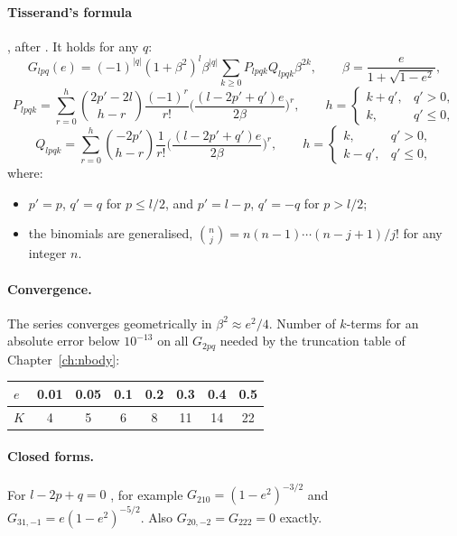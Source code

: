 \paragraph{Tisserand's formula} \citep[eq.~3.67--3.69]{Kaula2000}, after \citet[p.~256]{Tisserand1889}. It holds for any $q$:
\begin{equation}
  G_{lpq}(e)=(-1)^{|q|}(1+\beta^2)^l\beta^{|q|}\sum_{k\ge0}P_{lpqk}Q_{lpqk}\beta^{2k},\qquad \beta=\frac{e}{1+\sqrt{1-e^2}}, \label{eq:tisserand}
\end{equation}
\[
  P_{lpqk}=\sum_{r=0}^{h}\binom{2p'-2l}{h-r}\frac{(-1)^r}{r!}\Big(\frac{(l-2p'+q')e}{2\beta}\Big)^r,\qquad h=\begin{cases}k+q',&q'>0,\\k,&q'\le0,\end{cases}
\]
\[
  Q_{lpqk}=\sum_{r=0}^{h}\binom{-2p'}{h-r}\frac{1}{r!}\Big(\frac{(l-2p'+q')e}{2\beta}\Big)^r,\qquad h=\begin{cases}k,&q'>0,\\k-q',&q'\le0,\end{cases}
\]
where:
\begin{itemize}
  \item $p'=p$, $q'=q$ for $p\le l/2$, and $p'=l-p$, $q'=-q$ for $p>l/2$;
  \item the binomials are generalised, $\binom nj=n(n-1)\cdots(n-j+1)/j!$ for any integer $n$.
\end{itemize}

\paragraph{Convergence.} The series converges geometrically in $\beta^2\approx e^2/4$. Number of $k$-terms for an absolute error below $10^{-13}$ on all $G_{2pq}$ needed by the truncation table of Chapter~\ref{ch:nbody}:
\begin{center}
\begin{tabular}{l|ccccccc}\toprule
$e$ & 0.01 & 0.05 & 0.1 & 0.2 & 0.3 & 0.4 & 0.5\\\midrule
$K$ & 4 & 5 & 6 & 8 & 11 & 14 & 22\\\bottomrule
\end{tabular}
\end{center}

\paragraph{Closed forms.} For $l-2p+q=0$ \citep[eq.~3.66]{Kaula2000}, for example $G_{210}=(1-e^2)^{-3/2}$ and $G_{31,-1}=e(1-e^2)^{-5/2}$. Also $G_{20,-2}=G_{222}=0$ exactly.


